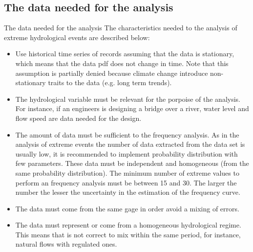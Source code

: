 \documentclass[8pt]{beamer}
\renewcommand{\emph}[1]{\textcolor{myorange}{#1}}
\begin{document}
\subsection{The data needed for the analysis}
\begin{frame}{The data needed for the analysis}
The characteristics needed to the analysis of extreme hydrological events are described below:
\begin{itemize}
\item Use historical time series of records assuming that the data is \emph{stationary}, which means that the data \emph{pdf} does not change in time. Note that this assumption is partially denied because \emph{climate change} introduce non-stationary traits to the data (e.g. long term trends). 
\item The hydrological variable must be \emph{relevant} for the porpoise of the analysis. For instance, if an engineers is designing a bridge over a river, water level and flow speed are data needed for the design.   
\item The amount of data must be sufficient to the frequency analysis. As in the analysis of extreme events the number of data extracted from the data set is usually low, it is recommended to implement probability distribution with few parameters. These data must be \emph{independent and homogeneous} (from the same probability distribution). The minimum number of extreme values to perform an frequency analysis must be between 15 and 30. The larger the number the lesser the uncertainty in the estimation of the frequency curve.  
\item The data must come from the same gage in order avoid a mixing of errors. 
\item The data must represent or come from a homogeneous hydrological regime. This means that is not correct to mix within the same period, for instance, natural flows with regulated ones. 
\end{itemize}
\end{frame}
\end{document}
